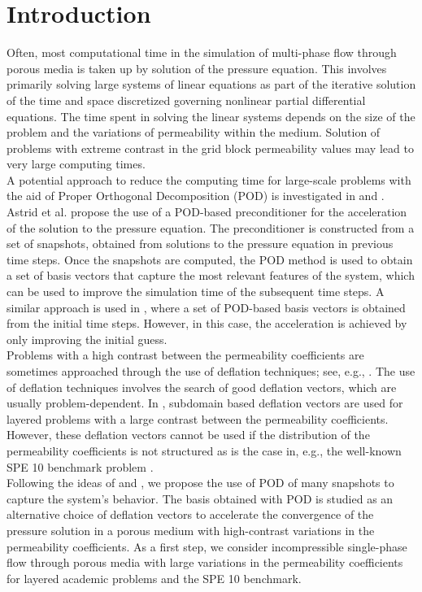 \documentclass{ecmorXV}
\begin{document}
\section{Introduction}
\hspace{0.5cm}Often, most computational time in the simulation of multi-phase flow through porous media is taken up by
solution of the pressure equation. This involves primarily solving large systems of linear equations as 
part of the iterative solution of the time and space discretized governing nonlinear partial differential 
equations. The time spent in solving the linear systems depends on the size of the problem and the 
variations of permeability within the medium. Solution of problems with extreme contrast in the grid block 
permeability values may lead to very large computing times.\\
A potential approach to reduce the computing time for large-scale problems with the aid of Proper Orthogonal 
Decomposition (POD) is investigated in \cite{Astrid11} and \cite{Mark06}. Astrid et al. \cite{Astrid11} 
propose the use of a POD-based preconditioner for the acceleration  of the solution to the pressure equation. 
The preconditioner is constructed from a set of snapshots, obtained from solutions to the pressure equation 
in previous time steps. Once the snapshots are computed, the POD method is used to obtain a set of basis 
vectors that capture the most relevant features of the system, which can be used to improve the simulation 
time of the subsequent time steps. A similar approach is used in \cite{Mark06}, where a set of POD-based 
basis vectors is obtained from the initial time steps. However, in this case, the acceleration is 
achieved by only improving the initial guess.\\
Problems with a high contrast between the permeability coefficients are sometimes approached through the 
use of deflation techniques; see, e.g., \cite{Vuik99}. The use of deflation techniques involves the search 
of good deflation vectors, which are usually problem-dependent. In \cite{Vuik99}, subdomain based deflation 
vectors are used for layered problems with a large contrast between the permeability coefficients. However, 
these deflation vectors cannot be used if the distribution of the permeability coefficients  is not 
structured as is the case in, e.g., the well-known SPE 10 benchmark problem \cite{Christie01}.\\
Following the ideas of \cite{Astrid11} and \cite{Mark06}, we propose the use of POD of many snapshots to capture 
the system's behavior. The basis obtained with POD is studied as an alternative choice of deflation vectors 
to accelerate the convergence of the pressure solution in a porous medium with high-contrast variations in the 
permeability coefficients. As a first step, we consider incompressible single-phase flow through porous media 
with large variations in the permeability coefficients for layered academic problems and the SPE 10 benchmark.\\
\end{document}
